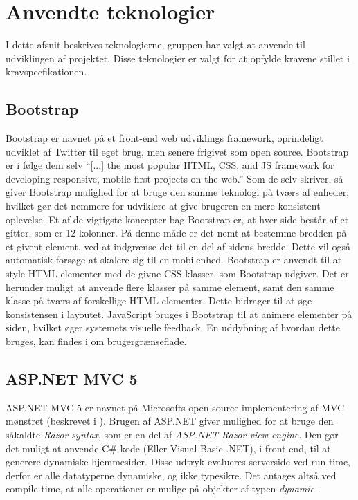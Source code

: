 \section{Anvendte teknologier}
I dette afsnit beskrives teknologierne, gruppen har valgt at anvende til udviklingen af projektet.
Disse teknologier er valgt for at opfylde kravene stillet i kravspecfikationen.

\subsection{Bootstrap}
Bootstrap er navnet på et front-end web udviklings framework, oprindeligt udviklet af Twitter til eget brug, men senere frigivet som open source.
Bootstrap er i følge dem selv ``[...] the most popular HTML, CSS, and JS framework for developing responsive, mobile first projects on the web.'' \cite{GETBOOTSTRAP}
Som de selv skriver, så giver Bootstrap mulighed for at bruge den samme teknologi på tværs af enheder; hvilket gør det nemmere for udviklere at give brugeren en mere konsistent oplevelse.
Et af de vigtigste koncepter bag Bootstrap er, at hver side består af et gitter, som er 12 kolonner.
På denne måde er det nemt at bestemme bredden på et givent element, ved at indgrænse det til en del af sidens bredde. 
Dette vil også automatisk forsøge at skalere sig til en mobilenhed.
Bootstrap er anvendt til at style HTML elementer med de givne CSS klasser, som Bootstrap udgiver.
Det er herunder muligt at anvende flere klasser på samme element, samt den samme klasse på tværs af forskellige HTML elementer.
Dette bidrager til at øge konsistensen i layoutet.
JavaScript bruges i Bootstrap til at animere elementer på siden, hvilket øger systemets visuelle feedback.
En uddybning af hvordan dette bruges, kan findes i  om brugergrænseflade. \cite{GETBOOTSTRAP}

\subsection{ASP.NET MVC 5}\label{aspnet}
ASP.NET MVC 5 er navnet på Microsofts open source implementering af MVC mønstret (beskrevet i ).
Brugen af ASP.NET giver mulighed for at bruge den såkaldte \textit{Razor syntax}, som er en del af \textit{ASP.NET Razor view engine}.
Den gør det muligt at anvende C\#-kode (Eller Visual Basic .NET), i front-end, til at generere dynamiske hjemmesider.
Disse udtryk evalueres serverside ved run-time, derfor er alle datatyperne dynamiske, og ikke typesikre.
Det antages altså ved compile-time, at alle operationer er mulige på objekter af typen \textit{dynamic} \citep{UsingTypeDynamic}.

